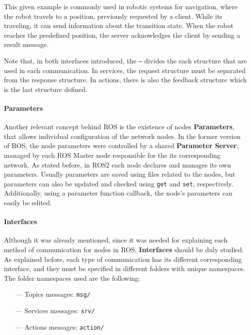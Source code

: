 This given example is commonly used in robotic systems for navigation, where the robot travels to a position, previously requested by a client. While its traveling, it can send information about the transition state. When the robot reaches the predefined position, the server acknowledges the client by sending a result message. 

Note that, in both interfaces introduced, the \texttt{---} divides the each structure that are used in each communication. In services, the request structure must be separated from the response structure. In actions, there is also the feedback structure which is the last structure defined.  
               
\paragraph{Parameters}
               
Another relevant concept behind ROS is the existence of nodes \textbf{Parameters}, that allows individual configuration of the network nodes. In the former version of ROS, the node parameters were controlled by a shared \textbf{Parameter Server}, managed by each ROS Master node responsible for the its corresponding network. As stated before, in ROS2 each node declares and manages its own parameters. Usually parameters are saved using files related to the nodes, but parameters can also be updated and checked using \texttt{get} and \texttt{set}, respectively. Additionally, using a parameter function callback, the node's parameters can easily be edited.
               
\paragraph{Interfaces}
               
Although it was already mentioned, since it was needed for explaining each method of communication for nodes in ROS, \textbf{Interfaces} should be duly studied.
As explained before, each type of communication has its different corresponding interface, and they must be specified in different folders with unique namespaces.
The folder namespaces used are the following:
\begin{itemize}
    \item[---]Topics messages: \texttt{msg/}
    \item[---]Services messages: \texttt{srv/}
    \item[---]Actions messages: \texttt{action/}
\end{itemize}
               
